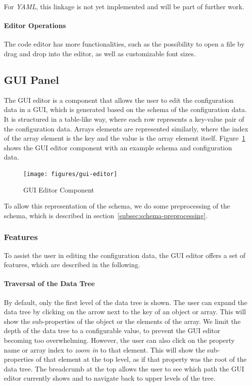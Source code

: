 For \textit{YAML}, this linkage is not yet implemented and will be part of further work.

\paragraph{Editor Operations}
The code editor has more functionalities, such as the possibility to open a file by drag and drop into the editor, as well as customizable font sizes.

\subsection{GUI Panel}\label{subsec:gui-editor}

The GUI editor is a component that allows the user to edit the configuration data in a GUI, which is generated based on the schema of the configuration data.
It is structured in a table-like way, where each row represents a key-value pair of the configuration data.
Arrays elements are represented similarly, where the index of the array element is the key and the value is the array element itself.
Figure~\ref{fig:gui-editor} shows the GUI editor component with an example schema and configuration data.

\begin{figure}[!t]
    \centering
    \texttt{[image: figures/gui-editor]} %
    \caption{GUI Editor Component}
    \label{fig:gui-editor}
\end{figure}

To allow this representation of the schema, we do some preprocessing of the schema, which is described in section~\ref{subsec:schema-preprocessing}.

\subsubsection{Features}\label{subsubsec:gui-editor-features}

To assist the user in editing the configuration data, the GUI editor offers a set of features, which are described in the following.

\paragraph{Traversal of the Data Tree}
By default, only the first level of the data tree is shown.
The user can expand the data tree by clicking on the arrow next to the key of an object or array.
This will show the sub-properties of the object or the elements of the array.
We limit the depth of the data tree to a configurable value, to prevent the GUI editor becoming too overwhelming.
However, the user can also click on the property name or array index to \textit{zoom in} to that element.
This will show the sub-properties of that element at the top level, as if that property was the root of the data tree.
The breadcrumb at the top allows the user to see which path the GUI editor currently shows and to navigate back to upper levels of the tree.

